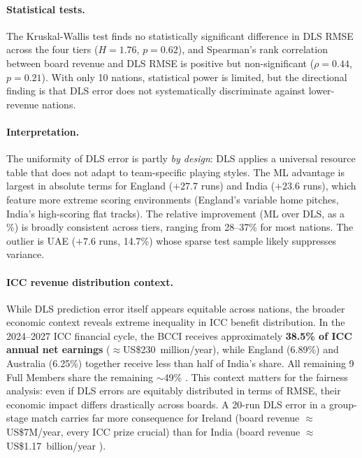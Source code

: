 \documentclass[12pt,a4paper,oneside]{report}
\begin{document}
\paragraph{Statistical tests.}  The Kruskal-Wallis test finds no statistically significant difference in DLS RMSE across the four tiers ($H=1.76$, $p=0.62$), and Spearman's rank correlation between board revenue and DLS RMSE is positive but non-significant ($\rho=0.44$, $p=0.21$).  With only 10 nations, statistical power is limited, but the directional finding is that DLS error does not systematically discriminate against lower-revenue nations.

\paragraph{Interpretation.}  The uniformity of DLS error is partly \emph{by design}: DLS applies a universal resource table that does not adapt to team-specific playing styles.  The ML advantage is largest in absolute terms for England ($+27.7$ runs) and India ($+23.6$ runs), which feature more extreme scoring environments (England's variable home pitches, India's high-scoring flat tracks).  The relative improvement (ML over DLS, as a \%) is broadly consistent across tiers, ranging from 28--37\% for most nations.  The outlier is UAE ($+7.6$ runs, 14.7\%) whose sparse test sample likely suppresses variance.

\paragraph{ICC revenue distribution context.}  While DLS prediction error itself appears equitable across nations, the broader economic context reveals extreme inequality in ICC benefit distribution.  In the 2024--2027 ICC financial cycle, the BCCI receives approximately \textbf{38.5\% of ICC annual net earnings} ($\approx$US\$230~million/year), while England (6.89\%) and Australia (6.25\%) together receive less than half of India's share.  All remaining 9 Full Members share the remaining $\sim$49\% \citep{espncricinfo_bcci_share}.  This context matters for the fairness analysis: even if DLS errors are equitably distributed in terms of RMSE, their economic impact differs drastically across boards.  A 20-run DLS error in a group-stage match carries far more consequence for Ireland (board revenue $\approx$US\$7M/year, every ICC prize crucial) than for India (board revenue $\approx$US\$1.17~billion/year \citep{sportsmint2024bcci}).
\end{document}
